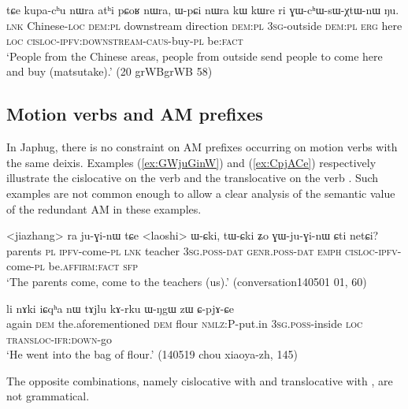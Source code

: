 \begin{exe}
\ex \label{ex:GWchWsWXtWnW}
\gll tɕe kupa-cʰu nɯra atʰi pɕoʁ nɯra, ɯ-pɕi nɯra kɯ kɯre ri ɣɯ-cʰɯ-sɯ-χtɯ-nɯ ŋu.  \\
\textsc{lnk} Chinese-\textsc{loc} \textsc{dem:pl} downstream direction \textsc{dem:pl} \textsc{3sg}-outside  \textsc{dem:pl}  \textsc{erg} here \textsc{loc} \textsc{cisloc}-\textsc{ipfv}:\textsc{downstream}-\textsc{caus}-buy-\textsc{pl} be:\textsc{fact} \\ 
\glt `People from the Chinese areas, people from outside send people to come here and buy (matsutake).' (20 grWBgrWB 58)  
  \end{exe} 


\subsection{Motion verbs and AM prefixes}
In Japhug, there is no constraint on AM prefixes occurring on motion verbs with the same deixis. Examples (\ref{ex:GWjuGinW}) and (\ref{ex:CpjACe}) respectively illustrate the cislocative on the verb  and the translocative on the verb . Such examples are not common enough to allow a clear analysis of the semantic value of the redundant AM in these examples.

\begin{exe}
\ex \label{ex:GWjuGinW}
 \gll <jiazhang> ra ju-ɣi-nɯ tɕe <laoshi> ɯ-ɕki, tɯ-ɕki ʑo ɣɯ-ju-ɣi-nɯ ɕti netɕi? \\
 parents \textsc{pl} \textsc{ipfv}-come-\textsc{pl} \textsc{lnk} teacher \textsc{3sg}.\textsc{poss}-\textsc{dat} \textsc{genr}.\textsc{poss}-\textsc{dat} \textsc{emph} \textsc{cisloc}-\textsc{ipfv}-come-\textsc{pl} be.\textsc{affirm}:\textsc{fact} \textsc{sfp} \\
 \glt `The parents come, come to the teachers (us).' (conversation140501 01, 60)
\end{exe}

\begin{exe}
\ex \label{ex:CpjACe}
 \gll li nɤki iɕqʰa nɯ tɤjlu kɤ-rku ɯ-ŋgɯ zɯ ɕ-pjɤ-ɕe \\
 again \textsc{dem} the.aforementioned \textsc{dem} flour \textsc{nmlz}:P-put.in \textsc{3sg}.\textsc{poss}-inside \textsc{loc} \textsc{transloc}-\textsc{ifr}:\textsc{down}-go \\
 \glt `He went into the bag of flour.' (140519 chou xiaoya-zh, 145)
\end{exe}

The opposite combinations, namely cislocative with  and translocative with , are not grammatical. 

